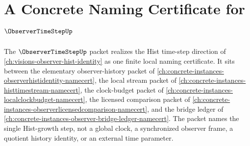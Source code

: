 \chapter{A Concrete Naming Certificate for $\ObserverTimeStepUp$}
\label{ch:concrete-instances-observer-time-step-namecert}

The $\ObserverTimeStepUp$ packet realizes the Hist time-step direction of \autoref{ch:visions-observer-hist-identity} as one finite local naming certificate. It sits between the elementary observer-history packet of \autoref{ch:concrete-instances-observerhistidentity-namecert}, the local stream packet of \autoref{ch:concrete-instances-histtimestream-namecert}, the clock-budget packet of \autoref{ch:concrete-instances-localclockbudget-namecert}, the licensed comparison packet of \autoref{ch:concrete-instances-observerlicensedcomparison-namecert}, and the bridge ledger of \autoref{ch:concrete-instances-observer-bridge-ledger-namecert}. The packet names the single Hist-growth step, not a global clock, a synchronized observer frame, a quotient history identity, or an external time parameter.



